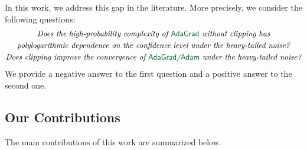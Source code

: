 \documentclass{article}
\begin{document}
In this work, we address this gap in the literature. More precisely, we consider the following questions:
\begin{gather*}
    \textit{Does the high-probability complexity of \algname{AdaGrad} without clipping has}\\
    \textit{polylogarithmic dependence on the confidence level under the heavy-tailed noise?}\\
    \textit{Does clipping improve the convergence of \algname{AdaGrad}/\algname{Adam} under the heavy-tailed noise?}
\end{gather*}
We provide a negative answer to the first question and a positive answer to the second one.

\subsection{Our Contributions}\label{section:contribution}

The main contributions of this work are summarized below.
\end{document}
